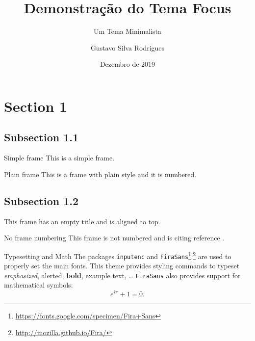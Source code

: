 \documentclass[aspectratio=169]{beamer}
\title{Demonstração do Tema Focus}
\subtitle{Um Tema Minimalista}
\author{Gustavo Silva Rodrigues}
\institute{Universidade Federal de Uberlândia}
\date{Dezembro de 2019}
\begin{document}
    \begin{frame}
        \maketitle
    \end{frame}
    
    \section{Section 1}
    \subsection{Subsection 1.1}
    \begin{frame}{Simple frame}
        This is a simple frame.
    \end{frame}

    \begin{frame}[plain]{Plain frame}
        This is a frame with plain style and it is numbered.
    \end{frame}
    
    \subsection{Subsection 1.2}
    \begin{frame}[t]
        This frame has an empty title and is aligned to top.
    \end{frame}
    
    \begin{frame}[noframenumbering]{No frame numbering}
        This frame is not numbered and is citing reference \cite{knuth74}.
    \end{frame}
    
    \begin{frame}{Typesetting and Math}
        The packages \texttt{inputenc} and \texttt{FiraSans}\footnote{\url{https://fonts.google.com/specimen/Fira+Sans}}\textsuperscript{,}\footnote{\url{http://mozilla.github.io/Fira/}} are used to properly set the main fonts.
        \vfill
        This theme provides styling commands to typeset \emph{emphasized}, \alert{alerted}, \textbf{bold}, \textcolor{example}{example text}, \dots
        \vfill
        \texttt{FiraSans} also provides support for mathematical symbols:
        \begin{equation*}
            e^{i\pi} + 1 = 0.
        \end{equation*}
    \end{frame}
\end{document}
